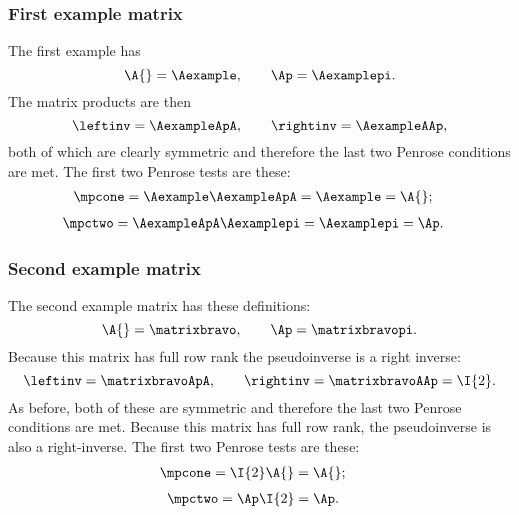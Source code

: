\subsubsection{First example matrix}
The first example has
\begin{equation}
  \A{} = \Aexample, \qquad \Ap = \Aexamplepi.
\end{equation}
The matrix products are then
\begin{equation}
  \leftinv = \AexampleApA, \qquad \rightinv = \AexampleAAp,
  \label{eq:mp:projectors:1}
\end{equation}
both of which are clearly symmetric and therefore the last two Penrose conditions are met. The first two Penrose tests are these:
\begin{equation}
  \begin{split}
     \mpcone &= \Aexample\AexampleApA = \Aexample = \A{};
  \end{split}
\end{equation}
\begin{equation}
  \begin{split}
     \mpctwo &= \AexampleApA\Aexamplepi = \Aexamplepi = \Ap.
  \end{split}
\end{equation}
%

\subsubsection{Second example matrix}
The second example matrix has these definitions:
\begin{equation}
  \A{} = \matrixbravo, \qquad \Ap = \matrixbravopi.
\end{equation}
Because this matrix has full row rank the pseudoinverse is a right inverse:
\begin{equation}
  \leftinv = \matrixbravoApA, \qquad \rightinv = \matrixbravoAAp = \I{2}.
  \label{eq:mp:projectors:2}
\end{equation}
As before, both of these are symmetric and therefore the last two Penrose conditions are met. Because this matrix has full row rank, the pseudoinverse is also a right-inverse. The first two Penrose tests are these:
\begin{equation}
  \begin{split}
     \mpcone &= \I{2}\A{} = \A{};
  \end{split}
\end{equation}
\begin{equation}
  \begin{split}
     \mpctwo &= \Ap\I{2} = \Ap.
  \end{split}
\end{equation}

